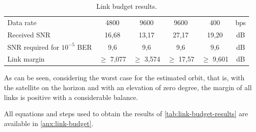 \begin{table}[!h]
\begin{tabular}{L{0.3\textwidth}ccccc}
        Data rate                       & 4800          & 9600          & 9600          & 400           & bps \\
        Received SNR                    & 16,68         & 13,17         & 27,17         & 19,20         & dB \\
        SNR required for $10^{-5}$ BER\footnotemark & 9,6           & 9,6           & 9,6           & 9,6           & dB \\
        Link margin                     & $\geq$ 7,077  & $\geq$ 3,574  & $\geq$ 17,57  & $\geq$ 9,601  & dB \\
        \bottomrule[1.5pt]
    \end{tabular}
    \caption{Link budget results.}
    \label{tab:link-budget-results}
\end{table}


As can be seen, considering the worst case for the estimated orbit, that is, with the satellite on the horizon and with an elevation of zero degree, the margin of all links is positive with a considerable balance.

All equations and steps used to obtain the results of \autoref{tab:link-budget-results} are available in \autoref{anx:link-budget}.
